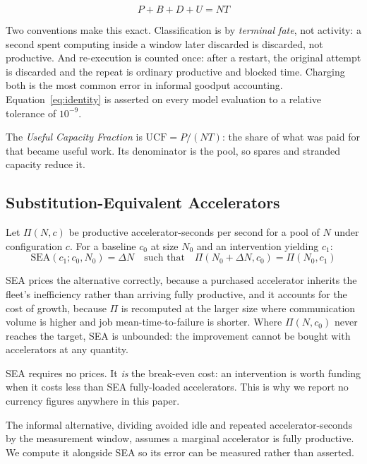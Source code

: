 \documentclass[11pt]{article}
\begin{document}
\begin{equation}
P + B + D + U = N T
\label{eq:identity}
\end{equation}

Two conventions make this exact. Classification is by \emph{terminal fate},
not activity: a second spent computing inside a window later discarded is
discarded, not productive. And re-execution is counted once: after a restart,
the original attempt is discarded and the repeat is ordinary productive and
blocked time. Charging both is the most common error in informal goodput
accounting. Equation~\ref{eq:identity} is asserted on every model evaluation to
a relative tolerance of $10^{-9}$.

The \emph{Useful Capacity Fraction} is $\mathrm{UCF} = P / (N T)$: the share of
what was paid for that became useful work. Its denominator is the pool, so
spares and stranded capacity reduce it.

\subsection{Substitution-Equivalent Accelerators}

Let $\Pi(N, c)$ be productive accelerator-seconds per second for a pool of $N$
under configuration $c$. For a baseline $c_0$ at size $N_0$ and an intervention
yielding $c_1$:
\begin{equation}
\mathrm{SEA}(c_1; c_0, N_0) = \Delta N \quad \text{such that} \quad \Pi(N_0 + \Delta N, c_0) = \Pi(N_0, c_1)
\label{eq:sea}
\end{equation}

SEA prices the alternative correctly, because a purchased accelerator inherits
the fleet's inefficiency rather than arriving fully productive, and it accounts
for the cost of growth, because $\Pi$ is recomputed at the larger size where
communication volume is higher and job mean-time-to-failure is shorter. Where
$\Pi(N, c_0)$ never reaches the target, SEA is unbounded: the improvement cannot
be bought with accelerators at any quantity.

SEA requires no prices. It \emph{is} the break-even cost: an intervention is
worth funding when it costs less than SEA fully-loaded accelerators. This is why
we report no currency figures anywhere in this paper.

The informal alternative, dividing avoided idle and repeated accelerator-seconds
by the measurement window, assumes a marginal accelerator is fully productive.
We compute it alongside SEA so its error can be measured rather than asserted.
\end{document}

